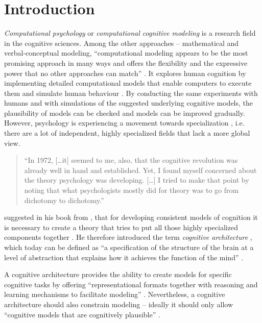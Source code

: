 \chapter{Introduction}

\emph{Computational psychology} or \emph{computational cognitive modeling} is a research field in the cognitive sciences. Among the other approaches -- mathematical and verbal-conceptual modeling, ``computational modeling appears to be the most promising approach in many ways and offers the flexibility and the expressive power that no other approaches can match'' \cite[vii]{sun_introduction_2008}. It explores human cognition by implementing detailed computational models that enable computers to execute them and simulate human behaviour \cite[3]{sun_introduction_2008}. By conducting the same experiments with humans and with simulations of the suggested underlying cognitive models, the plausibility of models can be checked and models can be improved gradually. However, psychology is experiencing a movement towards specialization \cite{anderson_integrated_2004}, i.e. there are a lot of independent, highly specialized fields that lack a more global view.

\begin{quote}
``In 1972, [\dots it] seemed to me, also, that the cognitive revolution was already well in hand and established. Yet, I found myself concerned about the theory psychology was developing. [\dots] I tried to make that point by noting that what psychologists mostly did for theory was to go from dichotomy to dichotomy.'' \cite[1\psq]{newell_unified_1990}
\end{quote}

\citeauthor{newell_unified_1990} suggested in his book from \citeyear{newell_unified_1990} \cite{newell_unified_1990}, that for developing consistent models of cognition it is necessary to create a theory that tries to put all those highly specialized components together \cite[1036]{anderson_integrated_2004}. He therefore introduced the term \emph{cognitive architecture} \cite[5]{anderson_how_2007}, which today can be defined as ``a specification of the structure of the brain at a level of abstraction that explains how it achieves the function of the mind'' \cite[7]{anderson_how_2007}.

A cognitive architecture provides the ability to create models for specific cognitive tasks \cite[29]{taatgen_modeling_2006} by offering ``representational formats together with reasoning and learning mechanisms to facilitate modeling'' \cite[29]{taatgen_modeling_2006}. Nevertheless, a cognitive architecture should also constrain modeling -- ideally it should only allow ``cognitive models that are cognitively plausible'' \cite[29]{taatgen_modeling_2006}.

